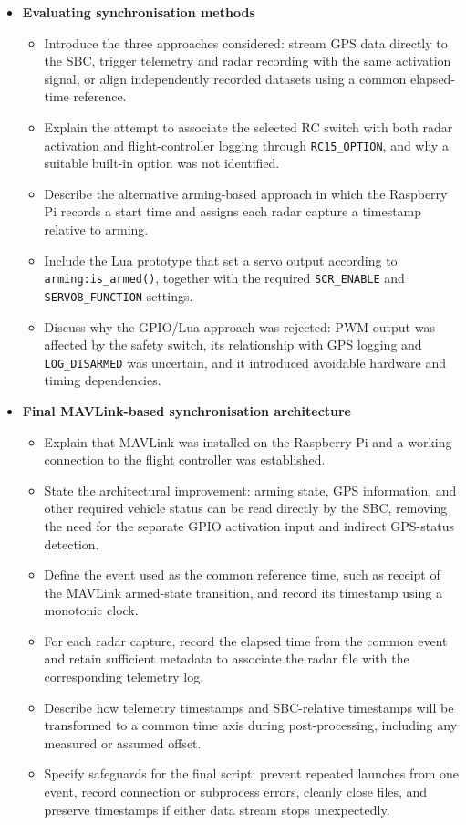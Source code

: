 \begin{itemize}
    \item \textbf{Evaluating synchronisation methods}
    \begin{itemize}
        \item Introduce the three approaches considered: stream GPS data directly to the SBC, trigger telemetry and radar recording with the same activation signal, or align independently recorded datasets using a common elapsed-time reference.
        \item Explain the attempt to associate the selected RC switch with both radar activation and flight-controller logging through \texttt{RC15\_OPTION}, and why a suitable built-in option was not identified.
        \item Describe the alternative arming-based approach in which the Raspberry Pi records a start time and assigns each radar capture a timestamp relative to arming.
        \item Include the Lua prototype that set a servo output according to \texttt{arming:is\_armed()}, together with the required \texttt{SCR\_ENABLE} and \texttt{SERVO8\_FUNCTION} settings.
        \item Discuss why the GPIO/Lua approach was rejected: PWM output was affected by the safety switch, its relationship with GPS logging and \texttt{LOG\_DISARMED} was uncertain, and it introduced avoidable hardware and timing dependencies.
    \end{itemize}

    \item \textbf{Final MAVLink-based synchronisation architecture}
    \begin{itemize}
        \item Explain that MAVLink was installed on the Raspberry Pi and a working connection to the flight controller was established.
        \item State the architectural improvement: arming state, GPS information, and other required vehicle status can be read directly by the SBC, removing the need for the separate GPIO activation input and indirect GPS-status detection.
        \item Define the event used as the common reference time, such as receipt of the MAVLink armed-state transition, and record its timestamp using a monotonic clock.
        \item For each radar capture, record the elapsed time from the common event and retain sufficient metadata to associate the radar file with the corresponding telemetry log.
        \item Describe how telemetry timestamps and SBC-relative timestamps will be transformed to a common time axis during post-processing, including any measured or assumed offset.
        \item Specify safeguards for the final script: prevent repeated launches from one event, record connection or subprocess errors, cleanly close files, and preserve timestamps if either data stream stops unexpectedly.
    \end{itemize}


\end{itemize}
